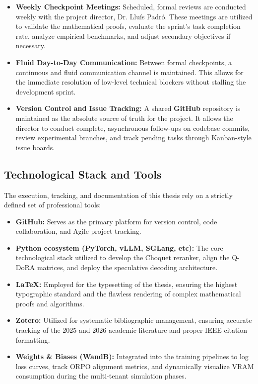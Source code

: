 \begin{itemize}
    \item \textbf{Weekly Checkpoint Meetings:} Scheduled, formal reviews are conducted weekly with the project director, Dr. Lluís Padró. These meetings are utilized to validate the mathematical proofs, evaluate the sprint's task completion rate, analyze empirical benchmarks, and adjust secondary objectives if necessary.
    \item \textbf{Fluid Day-to-Day Communication:} Between formal checkpoints, a continuous and fluid communication channel is maintained. This allows for the immediate resolution of low-level technical blockers without stalling the development sprint.
    \item \textbf{Version Control and Issue Tracking:} A shared \textbf{GitHub} repository is maintained as the absolute source of truth for the project. It allows the director to conduct complete, asynchronous follow-ups on codebase commits, review experimental branches, and track pending tasks through Kanban-style issue boards.
\end{itemize}

\subsection{Technological Stack and Tools}
\label{subsec:technological-tools}

The execution, tracking, and documentation of this thesis rely on a strictly defined set of professional tools:

\begin{itemize}
    \item \textbf{GitHub:} Serves as the primary platform for version control, code collaboration, and Agile project tracking.
    \item \textbf{Python ecosystem (PyTorch, vLLM, SGLang, etc):} The core technological stack utilized to develop the Choquet reranker, align the Q-DoRA matrices, and deploy the speculative decoding architecture.
    \item \textbf{LaTeX:} Employed for the typesetting of the thesis, ensuring the highest typographic standard and the flawless rendering of complex mathematical proofs and algorithms.
    \item \textbf{Zotero:} Utilized for systematic bibliographic management, ensuring accurate tracking of the 2025 and 2026 academic literature and proper IEEE citation formatting.
    \item \textbf{Weights \& Biases (WandB):} Integrated into the training pipelines to log loss curves, track ORPO alignment metrics, and dynamically visualize VRAM consumption during the multi-tenant simulation phases.
\end{itemize}